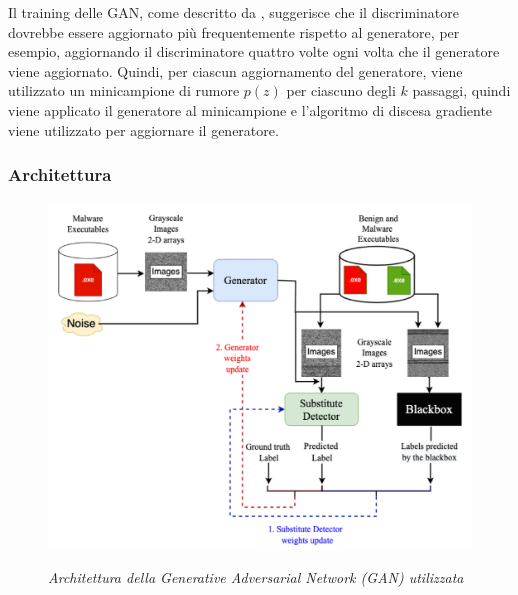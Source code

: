 Il training delle GAN, come descritto da \cite{article:Goodfellow2014}, suggerisce che il discriminatore dovrebbe essere aggiornato più frequentemente rispetto al generatore, per esempio, aggiornando il discriminatore quattro volte ogni volta che il generatore viene aggiornato.
Quindi, per ciascun aggiornamento del generatore, viene utilizzato un minicampione di rumore \( p(z) \) per ciascuno degli \( k \) passaggi, quindi viene applicato il generatore al minicampione e l'algoritmo di discesa gradiente viene utilizzato per aggiornare il generatore.


\subsubsection{Architettura}
\begin{figure}[ht]
    \centering
        \centering
        \includegraphics[width=0.6\linewidth]{images/GAN_architecture.png}
        \label{fig:gan_architecture}
        \caption{\emph{Architettura della Generative Adversarial Network (GAN) utilizzata}}
\end{figure}

\newpage

